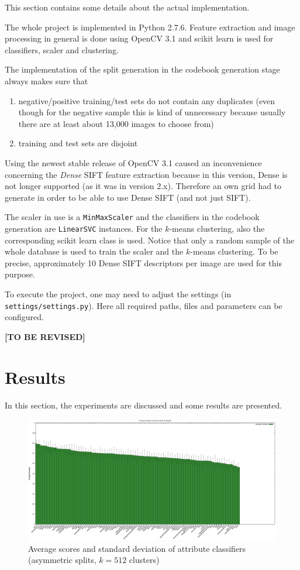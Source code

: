 \documentclass{vldb}
\newcommand{\tbr}{{\color{red}\textbf{[TO BE REVISED]}}}
\begin{document}
This section contains some details about the actual implementation.

The whole project is implemented in Python 2.7.6. Feature extraction and image
processing in general is done using OpenCV 3.1 and scikit learn is used
for classifiers, scaler and clustering.

The implementation of the split generation in the codebook generation stage always
makes sure that
\begin{enumerate}
  \item negative/positive training/test sets do not contain any duplicates (even
    though for the negative sample this is kind of unnecessary because usually
    there are at least about 13,000 images to choose from)
  \item training and test sets are disjoint
\end{enumerate}

Using the newest stable release of OpenCV 3.1 caused an inconvenience concerning
the \emph{Dense} SIFT feature extraction because in this version, Dense is not
longer supported (as it was in version 2.x). Therefore an own grid had to generate
in order to be able to use Dense SIFT (and not just SIFT).

The scaler in use is a \texttt{MinMaxScaler} and the classifiers in the codebook
generation are \texttt{LinearSVC} instances. For the $k$-means clustering, also
the corresponding scikit learn class is used. Notice that only a random sample
of the whole database is used to train the scaler and the $k$-means clustering.
To be precise, approximately 10 Dense SIFT descriptors per image are used for this
purpose.

To execute the project, one may need to adjust the settings (in
\texttt{settings/settings.py}). Here all required paths, files and parameters
can be configured.

\tbr

\section{Results}
\label{sec:results}

In this section, the experiments are discussed and some results are presented.

\begin{figure}[ht]
  \centering
  \includegraphics[width = \textwidth]{figs/scores_asymmetric_512classes.eps}
  \caption{Average scores and standard deviation of attribute classifiers
    (asymmetric splits, $k = 512$ clusters)
  }
  \label{fig:scores-classifiers-asymmetric-512}
\end{figure}
\end{document}

